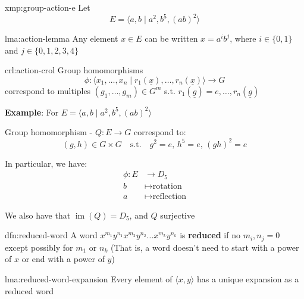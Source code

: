 \documentclass{article}
\DeclareMathOperator{\Ima}{im}
\begin{document}
\begin{xmp}{xmp:group-action-e}{}
    Let
    \[E = \langle a, b \mid a^{2}, b^{5}, (ab)^{2} \rangle\]
\end{xmp}

\begin{lma}[]{lma:action-lemma}{}
    Any element $x\in E$ can be written $x = a^{i}b^{j}$, where $i\in \{0, 1\}$ and $j\in \{0,1,2,3,4\}$
\end{lma}

\begin{crl}[]{crl:action-crol}{}
    Group homomorphisms
    \[\phi : \langle  x_{1},\dots,x_{n} \mid r_{1}(\underline{x}),\dots,r_{n}(\underline{x}) \rangle \to G\]
    correspond to multiples $(g_{1},\dots,g_{m})\in G^{m}$ s.t. $r_{1}(\underline{g}) = e,\dots,r_{n}(\underline{g})$
\end{crl}

\textbf{Example}: For $E = \langle a,b \mid a^{2},b^{5},(ab)^{2} \rangle$

Group homomorphism - $Q : E \to G$ correspond to:
\[(g,h)\in G \times G \quad\text{s.t.}\quad g^{2}=e,\,h^{5}=e,\,(gh)^{2}=e\]

In particular, we have:
\begin{align*}
    \phi : E &\to D_{5}\\
    b &\mapsto \text{rotation}\\
    a &\mapsto \text{reflection}
\end{align*}

We also have that $\Ima(Q) = D_{5}$, and $Q$ surjective


\begin{dfn}{dfn:reduced-word}{}
    A word $x^{m_{1}}y^{n_{1}}x^{m_{2}}y^{n_{2}}\dots x^{m_{k}}y^{n_{k}}$ is \textbf{reduced} if no $m_{i},n_{j} = 0$ except possibly for $m_{1}$ or $n_{k}$ (That is, a word doesn't need to start with a power of $x$ or end with a power of $y$)
\end{dfn}

\begin{lma}[]{lma:reduced-word-expansion}{}
    Every element of $\langle x, y \rangle$ has a unique expansion as a reduced word
\end{lma}
\end{document}
